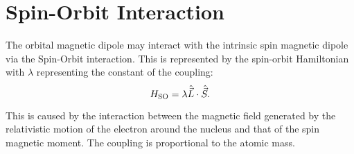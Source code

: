 \section{Spin-Orbit Interaction}
The orbital magnetic dipole may interact with the intrinsic spin magnetic dipole via the Spin-Orbit interaction. This is represented by the spin-orbit Hamiltonian with $\lambda$ representing the constant of the coupling: 
\begin{equation}
    H_{\ce{SO}} = \lambda \hat{\vec{L}}\cdot\hat{\vec{S}}. 
    \label{eq:spin_orbit_hamiltonian}
\end{equation}

This is caused by the interaction between the magnetic field generated by the relativistic motion of the electron around the nucleus and that of the spin magnetic moment. The coupling is proportional to the atomic mass. 

